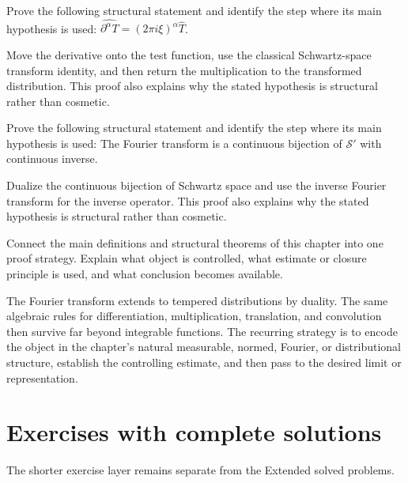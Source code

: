 \begin{problem}\label{prob:iii19-problem-10}
Prove the following structural statement and identify the step where its main hypothesis is used: $\widehat{\partial^\alpha T}=(2\pi i\xi)^\alpha\widehat T$.
\end{problem}
\begin{solution}
Move the derivative onto the test function, use the classical Schwartz-space transform identity, and then return the multiplication to the transformed distribution. This proof also explains why the stated hypothesis is structural rather than cosmetic.
\end{solution}

\begin{problem}\label{prob:iii19-problem-11}
Prove the following structural statement and identify the step where its main hypothesis is used: The Fourier transform is a continuous bijection of $\mathcal S'$ with continuous inverse.
\end{problem}
\begin{solution}
Dualize the continuous bijection of Schwartz space and use the inverse Fourier transform for the inverse operator. This proof also explains why the stated hypothesis is structural rather than cosmetic.
\end{solution}

\begin{problem}\label{prob:iii19-problem-12}
Connect the main definitions and structural theorems of this chapter into one proof strategy. Explain what object is controlled, what estimate or closure principle is used, and what conclusion becomes available.
\end{problem}
\begin{solution}
The Fourier transform extends to tempered distributions by duality. The same algebraic rules for differentiation, multiplication, translation, and convolution then survive far beyond integrable functions. The recurring strategy is to encode the object in the chapter's natural measurable, normed, Fourier, or distributional structure, establish the controlling estimate, and then pass to the desired limit or representation.
\end{solution}
\section{Exercises with complete solutions}
The shorter exercise layer remains separate from the Extended solved problems.

